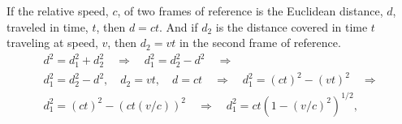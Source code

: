 If the relative speed, $c$, of two frames of reference
is the Euclidean distance, $d$, traveled in time, $t$, then $d = ct$.
And if $d_{2}$ is the distance covered in time $t$ traveling at speed, $v$,
then $d_{2} = vt$ in the second frame of reference.
\begin{multline}\label{eq:space-contraction}
d^{2}=d_{1}^{2} + d_{2}^{2}\quad\Rightarrow\quad
d_{1}^{2} =  d_{2}^{2} - d^{2}\quad\Rightarrow\\
d_{1}^{2} =  d_{2}^{2} - d^{2},
\quad d_{2}=vt, \quad d=ct \quad\Rightarrow\quad
d_{1}^{2} =  (ct)^2 - (vt)^{2}
\quad\Rightarrow\\
d_{1}^{2}=(ct)^2 - (ct(v/c))^{2}\quad\Rightarrow\quad
d_{1}^{2}=ct(1-(v/c)^{2})^{1/2},
\end{multline}
